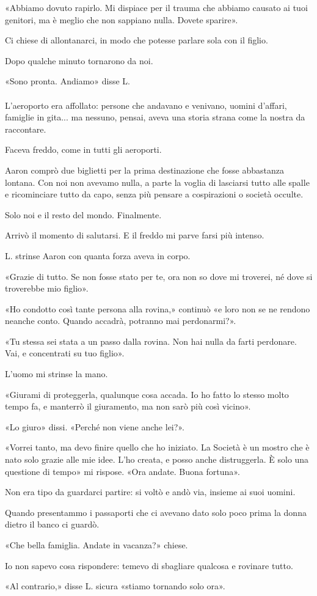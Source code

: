 \documentclass[a4paper,12pt]{book}
\begin{document}
«Abbiamo dovuto rapirlo. Mi dispiace per il trauma che abbiamo causato ai tuoi
genitori, ma è meglio che non sappiano nulla. Dovete sparire».

Ci chiese di allontanarci, in modo che potesse parlare sola con il figlio.

Dopo qualche minuto tornarono da noi.

«Sono pronta. Andiamo» disse L.

\paragraph{}
L'aeroporto era affollato: persone che andavano e venivano, uomini d'affari,
famiglie in gita... ma nessuno, pensai, aveva una storia strana come la nostra
da raccontare.

Faceva freddo, come in tutti gli aeroporti.

Aaron comprò due biglietti per la prima destinazione che fosse abbastanza
lontana. Con noi non avevamo nulla, a parte la voglia di lasciarsi tutto alle
spalle e ricominciare tutto da capo, senza più pensare a cospirazioni o società
occulte.

Solo noi e il resto del mondo. Finalmente.

Arrivò il momento di salutarsi. E il freddo mi parve farsi più intenso.

L. strinse Aaron con quanta forza aveva in corpo.

«Grazie di tutto. Se non fosse stato per te, ora non so dove mi troverei, né
dove si troverebbe mio figlio».

«Ho condotto così tante persona alla rovina,» continuò «e loro non se ne rendono
neanche conto. Quando accadrà, potranno mai perdonarmi?».

«Tu stessa sei stata a un passo dalla rovina. Non hai nulla da farti perdonare.
Vai, e concentrati su tuo figlio».

L'uomo mi strinse la mano.

«Giurami di proteggerla, qualunque cosa accada. Io ho fatto lo stesso molto
tempo fa, e manterrò il giuramento, ma non sarò più così vicino».

«Lo giuro» dissi. «Perché non viene anche lei?».

«Vorrei tanto, ma devo finire quello che ho iniziato. La Società è un mostro che
è nato solo grazie alle mie idee. L'ho creata, e posso anche distruggerla. È
solo una questione di tempo» mi rispose. «Ora andate. Buona fortuna».

Non era tipo da guardarci partire: si voltò e andò via, insieme ai suoi uomini.

Quando presentammo i passaporti che ci avevano dato solo poco prima la donna
dietro il banco ci guardò.

«Che bella famiglia. Andate in vacanza?» chiese.

Io non sapevo cosa rispondere: temevo di sbagliare qualcosa e rovinare tutto.

«Al contrario,» disse L. sicura «stiamo tornando solo ora».

\tableofcontents
\end{document}
